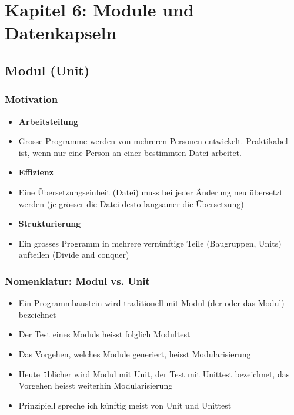 
\section{Kapitel 6: Module und Datenkapseln}
\label{sec:Kapitel 6: Module und Datenkapseln}

\subsection{Modul (Unit)}
\label{sec:Modul (Unit)}

\subsubsection{Motivation}
\label{sec:Motivation}
\begin{itemize}
	\item \textbf{Arbeitsteilung}
	\item[\-] Grosse Programme werden von mehreren Personen entwickelt. Praktikabel ist, wenn nur eine Person an einer bestimmten Datei arbeitet.
	\item \textbf{Effizienz}
	\item[\-] Eine Übersetzungseinheit (Datei) muss bei jeder Änderung neu übersetzt werden (je grösser die Datei desto langsamer die Übersetzung)
	\item \textbf{Strukturierung}
	\item[\-] Ein grosses  Programm in mehrere vernünftige Teile (Baugruppen, Units) aufteilen (Divide and conquer)
\end{itemize}

\subsubsection{Nomenklatur: Modul vs. Unit}
\label{sec:Nomenklatur: Modul vs. Unit}
\begin{itemize}
	\item Ein Programmbaustein wird traditionell mit Modul (der oder das Modul) bezeichnet
	\item Der Test eines Moduls heisst folglich Modultest
	\item Das Vorgehen, welches Module generiert, heisst Modularisierung
	\item Heute üblicher wird Modul mit Unit, der Test mit Unittest bezeichnet, das Vorgehen heisst weiterhin Modularisierung
	\item Prinzipiell spreche ich künftig meist von Unit und Unittest
\end{itemize}


